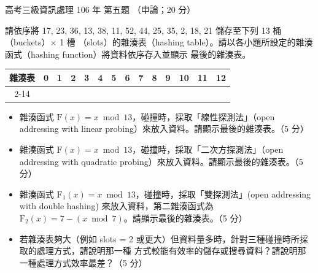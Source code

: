 \begin{pastexam}[label={px:gk3-106-ds-05}]{高考三級資訊處理 106 年 第五題}
（申論；20 分）

請依序將 17, 23, 36, 13, 38, 11, 52, 44, 25, 35, 2, 18, 21 儲存至下列 13 桶（buckets）$\times$ 1 槽
（slots）的雜湊表（hashing table）。請以各小題所設定的雜湊函式（hashing function）將資料依序存入並顯示
最後的雜湊表。
\begin{center}
\small
\begin{tabular}{|c|*{13}{c|}}
\hline
\multirow{2}{*}{雜湊表} & 0 & 1 & 2 & 3 & 4 & 5 & 6 & 7 & 8 & 9 & 10 & 11 & 12 \\ \cline{2-14}
 & \rule{0pt}{4.5ex}\phantom{00} & & & & & & & & & & & & \\ \hline
\end{tabular}
\end{center}
\begin{itemize}[leftmargin=2.2em]
\item[㈠] 雜湊函式 $\mathrm{F}(x) = x \bmod 13$，碰撞時，採取「線性探測法」（open addressing with linear
probing）來放入資料。請顯示最後的雜湊表。（5 分）
\item[㈡] 雜湊函式 $\mathrm{F}(x) = x \bmod 13$，碰撞時，採取「二次方探測法」（open addressing with quadratic
probing）來放入資料。請顯示最後的雜湊表。（5 分）
\item[㈢] 雜湊函式 $\mathrm{F}_1(x) = x \bmod 13$，碰撞時，採取「雙探測法」(open addressing with double
hashing) 來放入資料，第二雜湊函式為 $\mathrm{F}_2(x) = 7 - (x \bmod 7)$。請顯示最後的雜湊表。（5 分）
\item[㈣] 若雜湊表夠大（例如 slots = 2 或更大）但資料量多時，針對三種碰撞時所採取的處理方式，請說明那一種
方式較能有效率的儲存或搜尋資料？請說明那一種處理方式效率最差？（5 分）
\end{itemize}
\end{pastexam}

